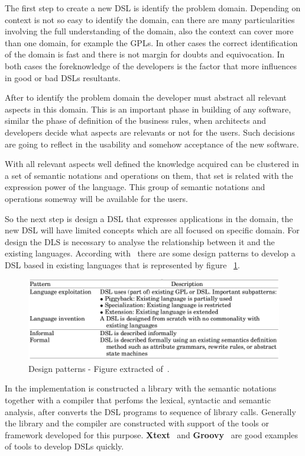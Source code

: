 The first step to create a new DSL is identify the problem domain. Depending on
context is not so easy to identify the domain, can there are many particularities
involving the full understanding of the domain, also the context can cover more 
than one domain, for example the GPLs. In other cases the correct identification
of the domain is fast and there is not margin for doubts and equivocation. In
both cases the foreknowledge of the developers is the factor that more influences
in good or bad DSLs resultants.

After to identify the problem domain the developer must abstract all relevant 
aspects in this domain. This is an important phase in building of any software,
similar the phase of definition of the business rules, when architects and
developers decide what aspects are relevants or not for the users. Such decisions
are going to reflect in the usability and somehow acceptance of the new software.

With all relevant aspects well defined the knowledge acquired can be clustered
in a set of semantic notations and operations on them, that set is related with
the expression power of the language. This group of semantic notations and operations
someway will be available for the users.

So the next step is design a DSL that expresses applications in the domain, the
new DSL will have limited concepts which are all focused on specific domain. For
design the DLS is necessary to analyse the relationship between it and the existing
languages. According with~\cite{mernik:2005} there are some design patterns to
develop a DSL based in existing languages that is represented by figure ~\ref{fig:patterns}.

\begin{figure}[htbp]
        \centering
        \includegraphics[width=\columnwidth]{img/designPatterns.png}
        \caption{Design patterns - Figure extracted of~\cite{mernik:2005}.}\label{fig:patterns}
\end{figure}

In the implementation is constructed a library with the semantic notations
together with a compiler that perfoms the lexical, syntactic and semantic analysis, 
after converts the DSL programs to sequence of library calls. Generally the library
and the compiler are constructed with support of the tools or framework developed
for this purpose. \textbf{Xtext}~\cite{xtext} and \textbf{Groovy}~\cite{groovyDSL, groovyDSLBook}
are good examples of tools to develop DSLs quickly.


